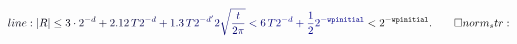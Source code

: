 \documentclass[12pt]{article}
\begin{document}
\makeatletter
\renewcommand*{\@textcolor}[3]{%
  \protect\leavevmode
  \begingroup
    \color#1{#2}#3%
  \endgroup
}
\makeatother
\begin{displaymath}
\mathcolor[RGB]{0,0,15}{line:
|R|\le3\cdot} \mathcolor[RGB]{0,0,30}{2^{-d}+} \mathcolor[RGB]{0,0,45}{2.12\,} \mathcolor[RGB]{0,0,60}{T} \mathcolor[RGB]{0,0,75}{2^{-d}+1.3\,} \mathcolor[RGB]{0,0,90}{T} \mathcolor[RGB]{0,0,105}{2^{-d'}2\sqrt{\frac{t}{2\pi}}<6\,} \mathcolor[RGB]{0,0,120}{T} \mathcolor[RGB]{0,0,135}{2^{-d}+\frac{1}{2}2^{-\texttt{wpinitial}} }<2^{-\texttt{wpinitial}}.\qedhere

norm_str:
\end{displaymath}
\end{document}
